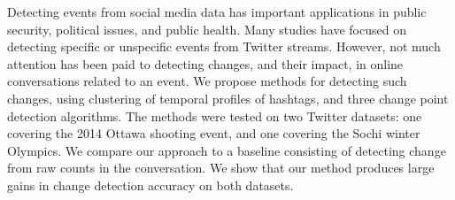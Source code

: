 Detecting events from social media data has important applications in public security, political issues, and public health. Many studies have focused on detecting specific or unspecific events from Twitter streams. However, not much attention has been paid to detecting changes, and their impact, in online conversations related to an event. We propose methods for detecting such changes, using clustering of temporal profiles of hashtags, and three change point detection algorithms. The methods were tested on two Twitter datasets: one covering the 2014 Ottawa shooting event, and one covering the Sochi winter Olympics. We compare our approach to a baseline consisting of detecting change from raw counts in the conversation. We show that our method produces large gains in change detection accuracy on both datasets.

